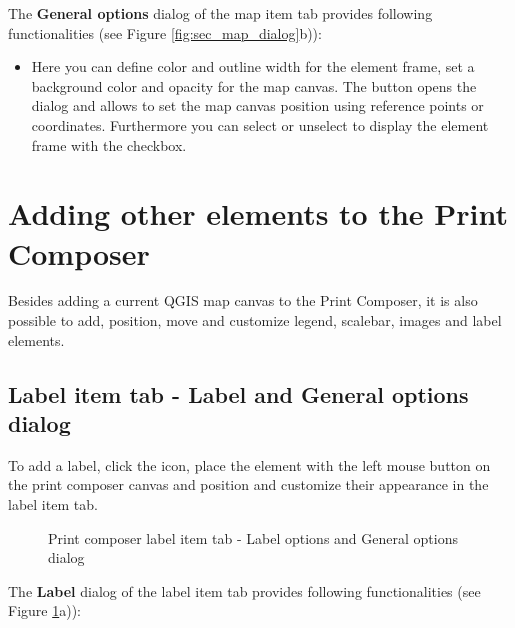 
The \textbf{General options} dialog of the map item tab provides following
functionalities (see Figure \ref{fig:sec_map_dialog}b)):

\begin{itemize}[label=--]
\item Here you can define color and outline width for the element frame, set
a background color and opacity for the map canvas. The 
button opens the  dialog and allows to set the map
canvas position using reference points or coordinates. Furthermore you can
select or unselect to display the element frame with the  checkbox.
\end{itemize}

\section{Adding other elements to the Print Composer}

Besides adding a current QGIS map canvas to the Print Composer, it is also possible
to add, position, move and customize legend, scalebar, images and label elements.

\subsection{Label item tab - Label and General options dialog}

To add a label, click the  icon, place
the element with the left mouse button on the print composer canvas and
position and customize their appearance in the label item tab.

\begin{figure}[ht]
\centering
   \hspace{1cm}
   \caption{Print composer label item tab - Label options and General options dialog \nixcaption}\label{fig:label_option}
\end{figure}


The \textbf{Label} dialog of the label item tab provides following
functionalities (see Figure \ref{fig:label_option}a)):

